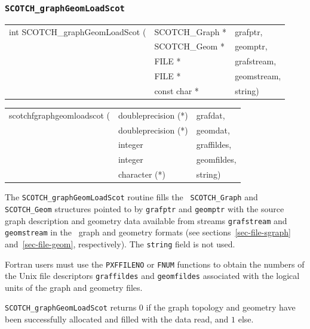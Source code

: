 \subsubsection{{\tt SCOTCH\_graphGeomLoadScot}}

\begin{itemize}
\progsyn

{\tt\begin{tabular}{l@{}ll}
int SCOTCH\_graphGeomLoadScot ( & SCOTCH\_Graph * & grafptr, \\
                                & SCOTCH\_Geom *  & geomptr, \\
                                & FILE *          & grafstream, \\
                                & FILE *          & geomstream, \\
                                & const char *    & string)
\end{tabular}}

{\tt\begin{tabular}{l@{}ll}
scotchfgraphgeomloadscot ( & doubleprecision (*) & grafdat, \\
                           & doubleprecision (*) & geomdat, \\
                           & integer             & graffildes, \\
                           & integer             & geomfildes, \\
                           & character (*)       & string)
\end{tabular}}

\progdes

The {\tt SCOTCH\_graphGeomLoadScot} routine fills the {\tt
SCOTCH\_\lbt Graph} and {\tt SCOTCH\_\lbt Geom} structures pointed to
by {\tt grafptr} and {\tt geomptr} with the source graph description
and geometry data available from streams {\tt graf\lbt stream} and
{\tt geom\lbt stream} in the \scotch\ graph and geometry formats
(see sections~\ref{sec-file-sgraph} and~\ref{sec-file-geom},
respectively). The {\tt string} field is not used.

Fortran users must use the {\tt PXFFILENO} or {\tt FNUM} functions to
obtain the numbers of the Unix file descriptors {\tt graf\lbt fildes}
and {\tt geom\lbt fildes} associated with the logical units of the
graph and geometry files.

\progret

{\tt SCOTCH\_graphGeomLoadScot} returns $0$ if the graph topology and
geometry have been successfully allocated and filled with the data
read, and $1$ else.
\end{itemize}

